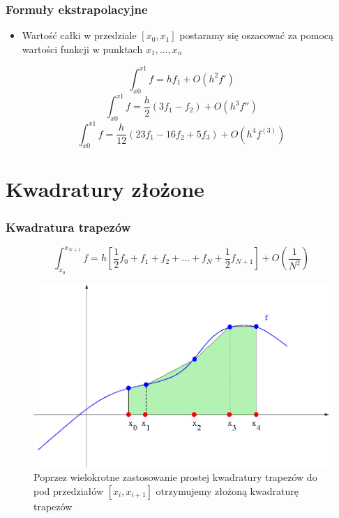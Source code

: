 \documentclass[compress,red]{beamer}
\begin{document}
	\begin{frame}
		\frametitle{Formuły ekstrapolacyjne} 
		\begin{itemize}
			\item
				Wartość całki w przedziale $[x_0, x_1]$ postaramy się oszacować
				za pomocą wartości funkcji w punktach $ x_1, \ldots, x_n $
		\end{itemize}
		
		\[ \int_{x0}^{x1} f = h f_1 + O(h^2 f') \]
		\[ \int_{x0}^{x1} f = \frac{h}{2} (3f_1 - f_2) + O(h^3 f'') \]
		\[ \int_{x0}^{x1} f = \frac{h}{12} (23f_1 - 16f_2 + 5f_3) + O(h^4 f^{(3)}) \]
	\end{frame}
	
\section{Kwadratury złożone}
	
	\begin{frame}
		\frametitle{Kwadratura trapezów}
		
		\[ \int_{x_0}^{x_{N+1}} f = h \left[ \frac{1}{2}f_0 + f_1 + f_2 + \ldots
		 + f_{N} + \frac{1}{2}f_{N+1} \right] + O(\frac{1}{N^2})\]
		 
		 \begin{figure}
		 	\includegraphics[scale=0.2]{./img/q_trap2}
		 	\caption{Poprzez wielokrotne zastosowanie prostej kwadratury trapezów do 
		pod przedziałów $[x_i, x_{i+1}]$ otrzymujemy złożoną kwadraturę trapezów}
		 \end{figure}
	\end{frame}	
	
\end{document}
